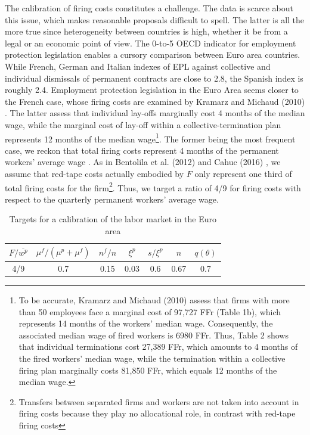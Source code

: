 \documentclass[a4paper]{article}
\begin{document}
The calibration of firing costs constitutes a challenge. The data is scarce about this issue, which makes reasonable proposals difficult to spell. The latter is all the more true since heterogeneity between countries is high, whether it be from a legal or an economic point of view. The 0-to-5 OECD indicator for employment protection legislation enables a cursory comparison between Euro area countries. While French, German and Italian indexes of EPL against collective and individual dismissals of permanent contracts are close to 2.8, the Spanish index is roughly 2.4. Employment protection legislation in the Euro Area seems closer to the French case, whose firing costs are examined by Kramarz and Michaud (2010) \cite{KRAMARZ201027}. The latter assess that individual lay-offs marginally cost 4 months of the median wage, while the marginal cost of lay-off within a collective-termination plan represents 12 months of the median wage\footnote{To be accurate, Kramarz and Michaud (2010) assess that firms with more than 50 employees face a marginal cost of 97,727 FFr (Table 1b), which represents 14 months of the workers' median wage. Consequently, the associated median wage of fired workers is 6980 FFr. Thus, Table 2 shows that individual terminations cost 27,389 FFr, which amounts to 4 months of the fired workers' median wage, while the termination within a collective firing plan marginally costs 81,850 FFr, which equals 12 months of the median wage.}. The former being the most frequent case, we reckon that total firing costs represent 4 months of the permanent workers' average wage . As in Bentolila et al. (2012) \cite{BENTOLILA19921013} and Cahuc (2016) \cite{IERE:IERE12167}, we assume that red-tape costs actually embodied by $F$ only represent one third of total firing costs for the firm\footnote{Transfers between separated firms and workers are not taken into account in firing costs because they play no allocational role, in contrast with red-tape firing costs}. Thus, we target a ratio of 4/9 for firing costs with respect to the quarterly permanent workers' average wage.

\begin{table}[H]
\centering
\begin{tabular}{|c c c c c c c|}
\hline
$F/\overline{w^p}$ & $\mu^f / \left( \mu^p + \mu^f \right)$ & $n^f / n$ & $\xi^p$ & $s / \xi^p $ &  $n$ & $q(\theta)$\\
\hline
4/9 & 0.7 & 0.15 & 0.03 & 0.6 & 0.67 & 0.7\\
\hline
\end{tabular}
\caption{Targets for a calibration of the labor market in the Euro area\label{targets}}
\end{table}
\end{document}
